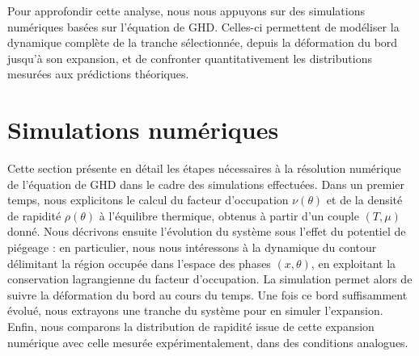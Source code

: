 \medskip

Pour approfondir cette analyse, nous nous appuyons sur des simulations numériques basées sur l’équation de \gls{GHD}. Celles-ci permettent de modéliser la dynamique complète de la tranche sélectionnée, depuis la déformation du bord jusqu’à son expansion, et de confronter quantitativement les distributions mesurées aux prédictions théoriques.


\section{Simulations numériques}
\label{sec:simulations}

Cette section présente en détail les étapes nécessaires à la résolution numérique de l’équation de \gls{GHD} dans le cadre des simulations effectuées. Dans un premier temps, nous explicitons le calcul du facteur d’occupation $\nu(\theta)$ et de la densité de rapidité $\rho(\theta)$ à l’équilibre thermique, obtenus à partir d’un couple $(T, \mu)$ donné. Nous décrivons ensuite l’évolution du système sous l’effet du potentiel de piégeage : en particulier, nous nous intéressons à la dynamique du contour délimitant la région occupée dans l’espace des phases $(x, \theta)$, en exploitant la conservation lagrangienne du facteur d’occupation. La simulation permet alors de suivre la déformation du bord au cours du temps. Une fois ce bord suffisamment évolué, nous extrayons une tranche du système pour en simuler l’expansion. Enfin, nous comparons la distribution de rapidité issue de cette expansion numérique avec celle mesurée expérimentalement, dans des conditions analogues.


